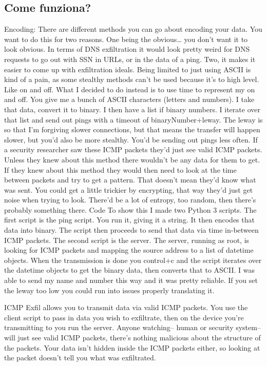 \subsection{Come funziona?}
Encoding:
There are different methods you can go about encoding your data. 
You want to do this for two reasons. 
One being the obvious… you don’t want it to look obvious. 
In terms of DNS exfiltration it would look pretty weird for DNS requests to go out with SSN in URLs, or in the data of a ping. 
Two, it makes it easier to come up with exfiltration ideals. 
Being limited to just using ASCII is kind of a pain, as some stealthy methods can’t be used because it’s to high level. 
Like on and off. 
\vspace{2ex} \newline 
What I decided to do instead is to use time to represent my on and off. 
You give me a bunch of ASCII characters (letters and numbers). 
I take that data, convert it to binary. I then have a list if binary numbers. 
I iterate over that list and send out pings with a timeout of binaryNumber+leway. 
The leway is so that I’m forgiving slower connections, but that means the transfer will happen slower, but you’d also be more stealthy. 
You’d be sending out pings less often.
\vspace{1ex} \newline
If a security researcher saw these ICMP packets they’d just see valid ICMP packets. 
Unless they knew about this method there wouldn’t be any data for them to get. 
If they knew about this method they would then need to look at the time between packets and try to get a pattern. 
That doesn’t mean they’d know what was sent. 
You could get a little trickier by encrypting, that way they’d just get noise when trying to look. 
There’d be a lot of entropy, too random, then there’s probably something there.
\vspace{2ex} \newline
Code
To show this I made two Python 3 scripts. 
The first script is the ping script. 
You run it, giving it a string. 
It then encodes that data into binary. 
The script then proceeds to send that data via time in-between ICMP packets. 
The second script is the server. 
The server, running as root, is looking for ICMP packets and mapping the source address to a list of datetime objects. 
When the transmission is done you control+c and the script iterates over the datetime objects to get the binary data, then converts that to ASCII. 
I was able to send my name and number this way and it was pretty reliable. 
If you set the leway too low you could run into issues properly translating it.



ICMP Exfil allows you to transmit data via valid ICMP packets. 
You use the client script to pass in data you wish to exfiltrate, then on the device you're transmitting to you run the server. 
Anyone watching-- human or security system-- will just see valid ICMP packets, there's nothing malicious about the structure of the packets. 
Your data isn't hidden inside the ICMP packets either, so looking at the packet doesn't tell you what was exfiltrated.
\vspace{4ex} \newline
